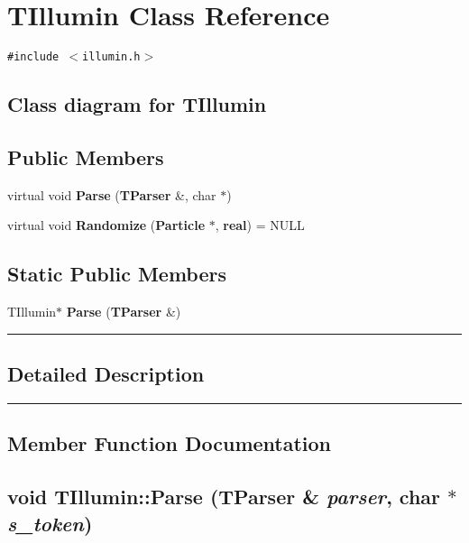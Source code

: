 \section{TIllumin  Class Reference}
\label{TIllumin}


{\tt \#include $<$illumin.h$>$}

\subsection*{Class diagram for TIllumin}
\begin{figure}[H]
\begin{center}
\leavevmode
\setlength{\epsfysize}{2cm}
\end{center}
\end{figure}
\subsection*{Public Members}
\begin{CompactItemize}
\item 
virtual void {\bf Parse} ({\bf TParser} \&, char $\ast$)
\item 
virtual void {\bf Randomize} ({\bf Particle} $\ast$, {\bf real}) = NULL
\end{CompactItemize}
\subsection*{Static Public Members}
\begin{CompactItemize}
\item 
TIllumin$\ast$ {\bf Parse} ({\bf TParser} \&)
\end{CompactItemize}
\vspace{0.4cm}\hrule\vspace{0.2cm}
\subsection*{Detailed Description}
\vspace{0.4cm}\hrule\vspace{0.2cm}
\subsection*{Member Function Documentation}
\label{TIllumin_a0}
\subsection{\setlength{\rightskip}{0pt plus 5cm}void TIllumin::Parse ({\bf TParser} \& {\em parser}, char $\ast$ {\em s\_\-token})\hspace{0.3cm}{\tt  [virtual]}}



